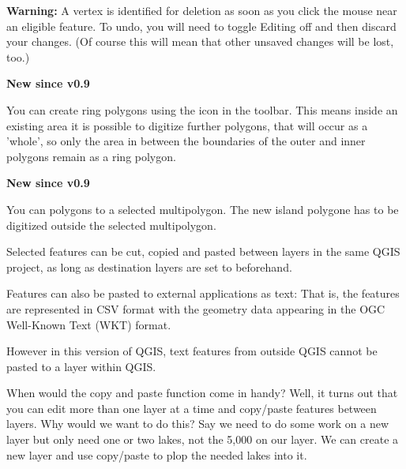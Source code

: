 \textbf{Warning:} A vertex is identified for deletion as
soon as you click the mouse near an eligible
feature.  To undo, you will need to toggle
Editing off and then discard your changes.
(Of course this will mean that other unsaved changes will be lost, too.)

\textbf{New since v0.9}

You can create ring polygons using the 
icon in the toolbar. This means inside an existing area it is
possible to digitize further polygons, that will occur as a 'whole', so only 
the area in between the boundaries of the outer and inner polygons remain as 
a ring polygon. 

\textbf{New since v0.9}

You can  polygons to a selected multipolygon. 
The new island polygone 
has to be digitized outside the selected multipolygon. 



Selected features can be cut, copied and pasted between layers in the
same QGIS project, as long as destination layers are set to 
 beforehand.

Features can also be pasted to external applications as text:  That is,
the features are represented in CSV format with the geometry data appearing 
in the OGC Well-Known Text (WKT) format.

However in this version of QGIS, text features from outside QGIS cannot 
be pasted to a layer within QGIS.

When would the copy and paste function come in handy? Well, it turns out that 
you can edit more than one layer at a time and copy/paste features between 
layers. Why would we want to do this?  Say we need to do some work on a new 
layer but only need one or two lakes, not the 5,000 on our  
layer. We can create a new layer and use copy/paste to plop the needed lakes 
into it. 


